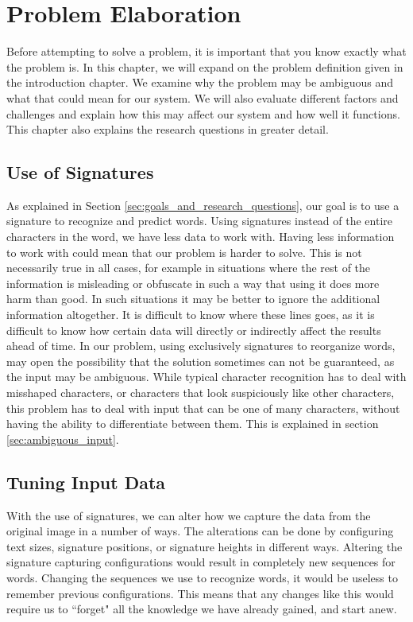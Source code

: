 
\chapter{Problem Elaboration}
\label{ch:problem}
Before attempting to solve a problem, it is important that you know exactly what the problem is. In this chapter, we will expand on the problem definition given in the introduction chapter. We examine why the problem may be ambiguous and what that could mean for our system. We will also evaluate different factors and challenges and explain how this may affect our system and how well it functions. This chapter also explains the research questions in greater detail.


\section{Use of Signatures}
As explained in Section \ref{sec:goals_and_research_questions}, our goal is to use a signature to recognize and predict words. Using signatures instead of the entire characters in the word, we have less data to work with. Having less information to work with could mean that our problem is harder to solve. This is not necessarily true in all cases, for example in situations where the rest of the information is misleading or obfuscate in such a way that using it does more harm than good. In such situations it may be better to ignore the additional information altogether. It is difficult to know where these lines goes, as it is difficult to know how certain data will directly or indirectly affect the results ahead of time. In our problem, using exclusively signatures to reorganize words, may open the possibility that the solution sometimes can not be guaranteed, as the input may be ambiguous. While typical character recognition has to deal with misshaped characters, or characters that look suspiciously like other characters, this problem has to deal with input that can be one of many characters, without having the ability to differentiate between them. This is explained in section \ref{sec:ambiguous_input}.


\section{Tuning Input Data}
\label{sec:tuning_input_data}
With the use of signatures, we can alter how we capture the data from the original image in a number of ways. The alterations can be done by configuring text sizes, signature positions, or signature heights in different ways. Altering the signature capturing configurations would result in completely new sequences for words. Changing the sequences we use to recognize words, it would be useless to remember previous configurations. This means that any changes like this would require us to ``forget" all the knowledge we have already gained, and start anew.

